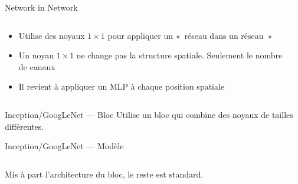 \begin{frame}{Network in Network}
  \begin{columns}
    \begin{column}{0.4\textwidth}
      \begin{itemize}
        \item Utilise des noyaux $1 \times 1$ pour appliquer un «~réseau dans un réseau~»
        \item Un noyau $1 \times 1$ ne change pas la structure spatiale. Seulement le nombre de canaux
        \item Il revient à appliquer un MLP à chaque position spatiale
      \end{itemize}
    \end{column}
    \begin{column}{0.6\textwidth}
    \end{column}
  \end{columns}
\end{frame}

\begin{frame}{Inception/GoogLeNet --- Bloc}
  Utilise un bloc qui combine des noyaux de tailles différentes.

\end{frame}

\begin{frame}{Inception/GoogLeNet --- Modèle}
  \begin{columns}
    \begin{column}{0.6\textwidth}
      Mis à part l'architecture du bloc, le reste est standard.
    \end{column}
    \begin{column}{0.4\textwidth}
    \end{column}
  \end{columns}
\end{frame}

